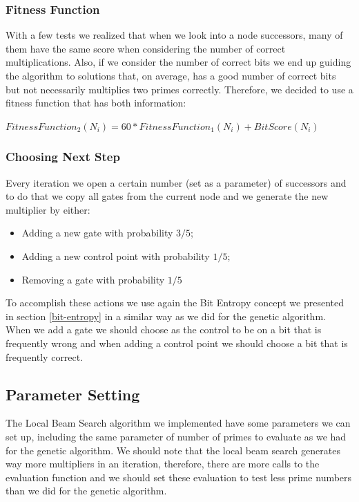 \documentclass[12pt]{article}
\begin{document}
\subsubsection{Fitness Function}
With a few tests we realized that when we look into a node successors, many of them have the same score when considering the number of correct multiplications. Also, if we consider the number of correct bits we end up guiding the algorithm to solutions that, on average, has a good number of correct bits but not necessarily multiplies two primes correctly. Therefore, we decided to use a fitness function that has both information:
\begin{center}
    $FitnessFunction_2 (N_i) = 60 * FitnessFunction_1 (N_i) + BitScore (N_i)$
\end{center}

\subsubsection{Choosing Next Step}
Every iteration we open a certain number (set as a parameter) of successors and to do that we copy all gates from the current node and we generate the new multiplier by either:
\begin{itemize}
    \item{Adding a new gate with probability $3/5$;}
    \item{Adding a new control point with probability $1/5$;}
    \item{Removing a gate with probability $1/5$}
\end{itemize}

To accomplish these actions we use again the Bit Entropy concept we presented in section \ref{bit-entropy} in a similar way as we did for the genetic algorithm. When we add a gate we should choose as the control to be on a bit that is frequently wrong and when adding a control point we should choose a bit that is frequently correct.

\subsection{Parameter Setting}
The Local Beam Search algorithm we implemented have some parameters we can set up, including the same parameter of number of primes to evaluate as we had for the genetic algorithm. We should note that the local beam search generates way more multipliers in an iteration, therefore, there are more calls to the evaluation function and we should set these evaluation to test less prime numbers than we did for the genetic algorithm.
\end{document}
